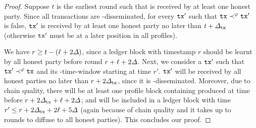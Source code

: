 \begin{proof}
    Suppose $t$ is the earliest round such that \tx is received by at least one honest party.
    Since all transactions are \txDelay-disseminated, for every $\mathtt{tx}'$ such that  $\mathtt{tx} \prec^\varphi \mathtt{tx}'$ is false, $\mathtt{tx}'$ is received by at least one honest party no later than $t + \varDelta_{\mathrm{tx}}$ (otherwise $\mathtt{tx}'$ must be at a later position in all profiles).

    We have $r \ge t - (\ell + 2\varDelta)$, since a ledger block with timestamp $r$ should be learnt by all honest party before round $r + \ell + 2\varDelta$.
    Next, we consider a $\mathtt{tx}'$ such that $\mathtt{tx}' \prec^\varphi \mathtt{tx}$ and its \PBWindowLen-time-window starting at time $r'$.
    $\mathtt{tx}'$ will be received by all honest parties no later than $r + 2\varDelta_{\mathrm{tx}}$, since it is \txDelay-disseminated.
    Moreover, due to chain quality, there will be at least one profile block \PB containing \tx produced at time before $r + 2\varDelta_{\mathrm{tx}} + \ell + 2\varDelta$; and \PB will be included in a ledger block with time $r' \le r + 2\varDelta_{\mathrm{tx}} + 2\ell + 5\varDelta$ (again because of chain quality and it takes up to \delay rounds to diffuse \PB to all honest parties).
    This concludes our proof.
\end{proof}
